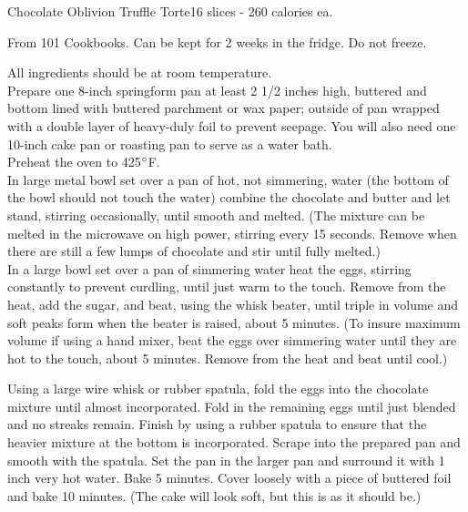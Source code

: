 \begin{recipe}{Chocolate Oblivion Truffle Torte}{16 slices - 260 calories ea.}{}

\freeform From 101 Cookbooks. Can be kept for 2 weeks in the fridge. Do not freeze.


All ingredients should be at room temperature.\\

Prepare one 8-inch springform pan at least 2 1/2 inches high, buttered and bottom lined with buttered parchment or wax paper; outside of pan wrapped with a double layer of heavy-duly foil to prevent seepage. You will also need one 10-inch cake pan or roasting pan to serve as a water bath.\\

Preheat the oven to 425$\degree$F.\\

In large metal bowl set over a pan of hot, not simmering, water (the bottom of the bowl should not touch the water) combine the chocolate and butter and let stand, stirring occasionally, until smooth and melted. (The mixture can be melted in the microwave on high power, stirring every 15 seconds. Remove when there are still a few lumps of chocolate and stir until fully melted.)\\

In a large bowl set over a pan of simmering water heat the eggs, stirring constantly to prevent curdling, until just warm to the touch. Remove from the heat, add the sugar, and beat, using the whisk beater, until triple in volume and soft peaks form when the beater is raised, about 5 minutes. (To insure maximum volume if using a hand mixer, beat the eggs over simmering water until they are hot to the touch, about 5 minutes. Remove from the heat and beat until cool.)\newpage

Using a large wire whisk or rubber spatula, fold  the eggs into the chocolate mixture until almost incorporated. Fold in the remaining eggs until just blended and no streaks remain. Finish by using a rubber spatula to ensure that the heavier mixture at the bottom is incorporated. Scrape into the prepared pan and smooth with the spatula. Set the pan in the larger pan and surround it with 1 inch very hot water. Bake 5 minutes. Cover loosely with a piece of buttered foil and bake 10 minutes. (The cake will look soft, but this is as it should be.)\\


\end{recipe}
